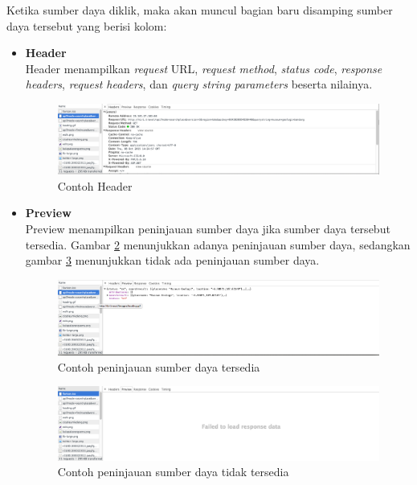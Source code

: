 \documentclass[a4paper,twoside]{article}
\begin{document}
Ketika sumber daya diklik, maka akan muncul bagian baru disamping sumber daya tersebut yang berisi kolom:
\begin{itemize}
	\item \textbf{Header}\\
			Header menampilkan \textit{request} URL, \textit{request method}, \textit{status code}, \textit{response headers}, \textit{request headers}, dan \textit{query string parameters} beserta nilainya.
			\begin{figure}[H]
				\centering
				\includegraphics[scale=0.3]{Gambar/devtools-network-header}
				\caption{Contoh Header} 
				\label{fig:2_devtools_network_header}
			\end{figure}
	\item \textbf{Preview}\\
			Preview menampilkan peninjauan sumber daya jika sumber daya tersebut tersedia. Gambar \ref{fig:2_devtools_network_preview_a} menunjukkan adanya peninjauan sumber daya, sedangkan gambar \ref{fig:2_devtools_network_preview_b} menunjukkan tidak ada peninjauan sumber daya.
			
			\begin{figure}[H]
				\centering
				\includegraphics[scale=0.3]{Gambar/devtools-network-preview-a}
				\caption{Contoh peninjauan sumber daya tersedia} 
				\label{fig:2_devtools_network_preview_a}
			\end{figure}
			
			\begin{figure}[H]
				\centering
				\includegraphics[scale=0.3]{Gambar/devtools-network-preview-b}
				\caption{Contoh peninjauan sumber daya tidak tersedia} 
				\label{fig:2_devtools_network_preview_b}
			\end{figure}
			

\end{itemize}
\end{document}
